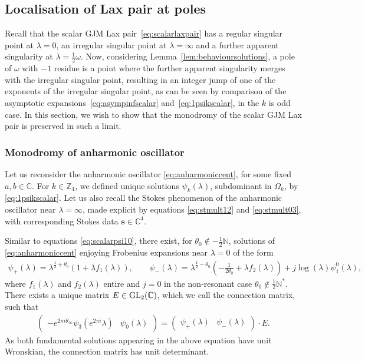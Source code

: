 \documentclass[pdftex]{sigma}
\numberwithin{equation}{section}
\newcommand{\om}{\omega}
\begin{document}
\subsection{Localisation of Lax pair at poles}\label{section:localisation}
Recall that the scalar GJM Lax pair~\eqref{eq:scalarlaxpair} has a regular singular point at $\lambda=0$, an irregular singular point at $\lambda=\infty$ and a further apparent singularity at $\lambda=\tfrac{1}{2}\om$. Now, considering Lemma~\ref{lem:behavioursolutions}, a pole of $\om$ with $-1$ residue is a point where the further apparent singularity merges with the irregular singular point, resulting in an integer jump of one of the exponents of the irregular singular point, as can be seen by comparison of the asymptotic expansions~\eqref{eq:asympinfscalar} and~\eqref{eq:1psikscalar}, in the $k$ is odd case.
In this section, we wish to show that the monodromy of the scalar GJM Lax pair is preserved in such a limit.

\subsubsection{Monodromy of anharmonic oscillator}
Let us reconsider the anharmonic oscillator \eqref{eq:anharmoniccent}, for some f\/ixed $a,b\in\mathbb{C}$. For $k\in \mathbb{Z}_4$,
we def\/ined unique solutions $\psi_k(\lambda)$, subdominant in $\Omega_k$, by \eqref{eq:1psikscalar}.
Let us also recall the Stokes phenomenon of the anharmonic oscillator near $\lambda=\infty$, made explicit by equations \eqref{eq:stmult12} and \eqref{eq:stmult03}, with corresponding Stokes data $\mathbf{s}\in\mathbb{C}^4$.

Similar to equations \eqref{eq:scalarpsi10}, there exist, for $\theta_0\notin -\tfrac{1}{2}\mathbb{N}$, solutions of \eqref{eq:anharmoniccent} enjoying Frobenius expansions near $\lambda=0$ of the form
\begin{gather*}
\psi_+(\lambda)=\lambda^{\tfrac{1}{2}+\theta_0} (1+\lambda f_1(\lambda)),\qquad
\psi_-(\lambda)=\lambda^{\tfrac{1}{2}-\theta_0}\left(-\frac{1}{2\theta_0}+\lambda f_2(\lambda)\right)+j\log(\lambda)\psi_1^0(\lambda),
\end{gather*}
where $f_1(\lambda)$ and $f_2(\lambda)$ entire and $j=0$ in the non-resonant case $\theta_0\notin \tfrac{1}{2}\mathbb{N}^*$. There exists a unique matrix $E\in {\rm GL}_2(\mathbb{C})$, which we call the connection matrix, such that
 \begin{gather*}%
 \begin{pmatrix}
 -e^{2\pi i \theta_\infty}\psi_3(e^{2\pi i}\lambda) & \psi_0(\lambda)
 \end{pmatrix}=\begin{pmatrix}
\psi_+(\lambda) & \psi_-(\lambda)
 \end{pmatrix}\cdot E.
 \end{gather*}
 As both fundamental solutions appearing in the above equation have unit Wronskian, the connection matrix has unit determinant.
\end{document}
